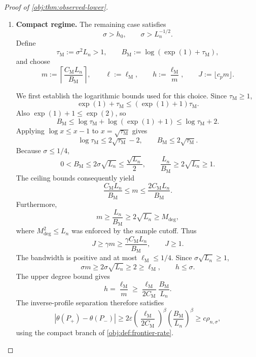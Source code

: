 \documentclass[11pt]{article}
\begin{document}
\begin{proof}[Proof of \cref{obj:thm:observed-lower}]
\begin{enumerate}
For the Gaussian tail parameter,
\[
\lambda=\frac{\ell^2}{\sigma^2}=a_{\mathrm I}^2m,
\qquad
2\lambda\le\gamma m\le J,
\]
and the radius calibration gives
\[
\frac{\exp(1)\lambda}{J}
\le\frac{\exp(1)a_{\mathrm I}^2}{\gamma}
\le\exp(-1/\gamma).
\]
Consequently,
\[
\mathcal T_{\sigma,\ell,J}
\le2\exp(-J/\gamma)\le2\exp(-m).
\]
Since \(m\ge S_{\mathrm I}\),
\[
N_{\mathrm I}\exp(-m)
\le
N_{\mathrm I}\exp(-S_{\mathrm I})
=
\frac{N_{\mathrm I}}{\exp(1)+N_{\mathrm I}}
\le1.
\]
Using \(h\le\sigma\) and \(d>0\), we obtain the complete sample-factor bound
\[
\begin{aligned}
n\sigma^{-\kappa-1}h^{2\beta+2\kappa+2}
\mathcal T_{\sigma,\ell,J}
&\le2n\sigma^d\exp(-m)\\
&=2N_{\mathrm I}\exp(-m)\le2.
\end{aligned}
\]
Hence
\[
n\chi^2(Q_\pm,Q_\star)
\le2B_{\mathrm I}\varepsilon^2
\le\log(1+\tau^2).
\]
The product comparison established above proves
\[
\operatorname{TV}(Q_{P_+}^n,Q_{P_-}^n)\le\tau.
\]

\item \textbf{Compact regime.}
The remaining case satisfies
\[
\sigma>h_0,\qquad \sigma>L_n^{-1/2}.
\]
Define
\[
\tau_{\mathrm M}:=\sigma^2L_n>1,\qquad
B_{\mathrm M}:=\log(\exp(1)+\tau_{\mathrm M}),
\]
and choose
\[
m:=\left\lceil\frac{C_{\mathrm M}L_n}{B_{\mathrm M}}\right\rceil,
\qquad
\ell:=\ell_{\mathrm M},\qquad
h:=\frac{\ell_{\mathrm M}}m,\qquad
J:=\lfloor c_pm\rfloor.
\]

We first establish the logarithmic bounds used for this choice. Since
\(\tau_{\mathrm M}\ge1\),
\[
\exp(1)+\tau_{\mathrm M}
\le(\exp(1)+1)\tau_{\mathrm M}.
\]
Also \(\exp(1)+1\le\exp(2)\), so
\[
B_{\mathrm M}
\le\log\tau_{\mathrm M}+\log(\exp(1)+1)
\le\log\tau_{\mathrm M}+2.
\]
Applying \(\log x\le x-1\) to \(x=\sqrt{\tau_{\mathrm M}}\) gives
\[
\log\tau_{\mathrm M}\le2\sqrt{\tau_{\mathrm M}}-2,
\qquad
B_{\mathrm M}\le2\sqrt{\tau_{\mathrm M}}.
\]
Because \(\sigma\le1/4\),
\[
0<B_{\mathrm M}
\le2\sigma\sqrt{L_n}
\le\frac{\sqrt{L_n}}2,
\qquad
\frac{L_n}{B_{\mathrm M}}\ge2\sqrt{L_n}\ge1.
\]
The ceiling bounds consequently yield
\[
\frac{C_{\mathrm M}L_n}{B_{\mathrm M}}
\le m\le\frac{2C_{\mathrm M}L_n}{B_{\mathrm M}}.
\]
Furthermore,
\[
m\ge\frac{L_n}{B_{\mathrm M}}
\ge2\sqrt{L_n}\ge M_{\mathrm{deg}},
\]
where \(M_{\mathrm{deg}}^2\le L_n\) was enforced by the sample cutoff. Thus
\[
J\ge\gamma m\ge
\frac{\gamma C_{\mathrm M}L_n}{B_{\mathrm M}},
\qquad J\ge1.
\]
The bandwidth is positive and at most \(\ell_{\mathrm M}\le1/4\). Since
\(\sigma\sqrt{L_n}\ge1\),
\[
\sigma m\ge2\sigma\sqrt{L_n}\ge2\ge\ell_{\mathrm M},
\qquad h\le\sigma.
\]
The upper degree bound gives
\[
h=\frac{\ell_{\mathrm M}}m
\ge
\frac{\ell_{\mathrm M}}{2C_{\mathrm M}}\frac{B_{\mathrm M}}{L_n}.
\]
The inverse-profile separation therefore satisfies
\[
|\theta(P_+)-\theta(P_-)|
\ge
2\varepsilon
\left(\frac{\ell_{\mathrm M}}{2C_{\mathrm M}}\right)^\beta
\left(\frac{B_{\mathrm M}}{L_n}\right)^\beta
\ge c\rho_{n,\sigma},
\]
using the compact branch of \cref{obj:def:frontier-rate}.


\end{enumerate}
\end{proof}
\end{document}
